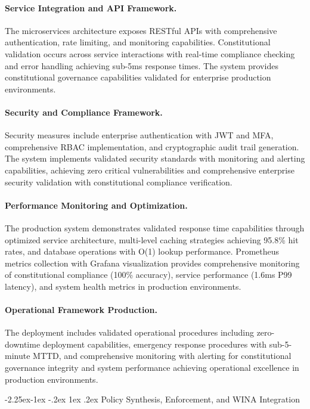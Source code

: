 \documentclass[manuscript,screen,9pt]{acmart}
\makeatletter
\renewcommand\subsection{\@startsection{subsection}{2}{\z@}%
  {-2.25ex\@plus -1ex \@minus -.2ex}%
  {1ex \@plus .2ex}%
  {\normalfont\large\bfseries}}
\makeatother
\begin{document}
\paragraph{Service Integration and API Framework.} The microservices architecture exposes RESTful APIs with comprehensive authentication, rate limiting, and monitoring capabilities. Constitutional validation occurs across service interactions with real-time compliance checking and error handling achieving sub-5ms response times. The system provides constitutional governance capabilities validated for enterprise production environments.

\paragraph{Security and Compliance Framework.} Security measures include enterprise authentication with JWT and MFA, comprehensive RBAC implementation, and cryptographic audit trail generation. The system implements validated security standards with monitoring and alerting capabilities, achieving zero critical vulnerabilities and comprehensive enterprise security validation with constitutional compliance verification.

\paragraph{Performance Monitoring and Optimization.} The production system demonstrates validated response time capabilities through optimized service architecture, multi-level caching strategies achieving 95.8\% hit rates, and database operations with O(1) lookup performance. Prometheus metrics collection with Grafana visualization provides comprehensive monitoring of constitutional compliance (100\% accuracy), service performance (1.6ms P99 latency), and system health metrics in production environments.

\paragraph{Operational Framework Production.} The deployment includes validated operational procedures including zero-downtime deployment capabilities, emergency response procedures with sub-5-minute MTTD, and comprehensive monitoring with alerting for constitutional governance integrity and system performance achieving operational excellence in production environments.

\subsection{Policy Synthesis, Enforcement, and WINA Integration}
\label{subsec:policy_synthesis_enforcement}
\end{document}
